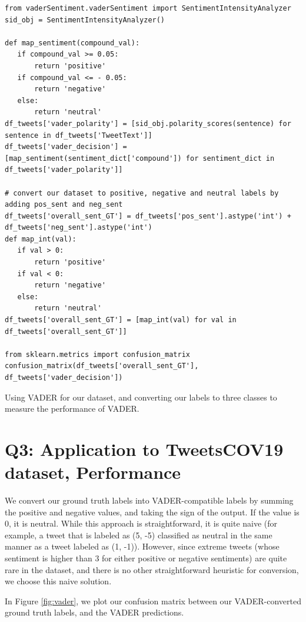 \begin{listing*}
\begin{verbatim}
from vaderSentiment.vaderSentiment import SentimentIntensityAnalyzer
sid_obj = SentimentIntensityAnalyzer()

def map_sentiment(compound_val):
   if compound_val >= 0.05:
       return 'positive'
   if compound_val <= - 0.05:
       return 'negative'
   else:
       return 'neutral'
df_tweets['vader_polarity'] = [sid_obj.polarity_scores(sentence) for sentence in df_tweets['TweetText']]
df_tweets['vader_decision'] = [map_sentiment(sentiment_dict['compound']) for sentiment_dict in df_tweets['vader_polarity']]

# convert our dataset to positive, negative and neutral labels by adding pos_sent and neg_sent
df_tweets['overall_sent_GT'] = df_tweets['pos_sent'].astype('int') + df_tweets['neg_sent'].astype('int')
def map_int(val):
   if val > 0:
       return 'positive'
   if val < 0:
       return 'negative'
   else:
       return 'neutral'
df_tweets['overall_sent_GT'] = [map_int(val) for val in df_tweets['overall_sent_GT']]

from sklearn.metrics import confusion_matrix
confusion_matrix(df_tweets['overall_sent_GT'], df_tweets['vader_decision'])
\end{verbatim}
\caption{Using VADER for our dataset, and converting our labels to three classes to measure the performance of VADER.}
\label{listing:p2-code1}
\end{listing*}


\section*{Q3: Application to TweetsCOV19 dataset, Performance}

We convert our ground truth labels into VADER-compatible labels by summing the positive and negative values, and taking the sign of the output. If the value is 0, it is neutral. While this approach is straightforward, it is quite naive (for example, a tweet that is labeled as (5, -5) classified as neutral in the same manner as a tweet labeled as (1, -1)). However, since extreme tweets (whose sentiment is higher than 3 for either positive or negative sentiments) are quite rare in the dataset, and there is no other straightforward heuristic for conversion, we choose this naive solution.

In Figure \ref{fig:vader}, we plot our confusion matrix between our VADER-converted ground truth labels, and the VADER predictions. 

